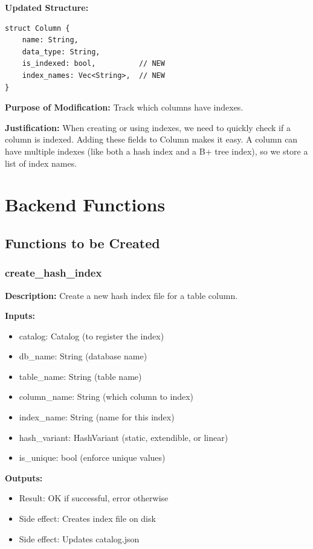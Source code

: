 \documentclass[11pt,a4paper]{article}
\begin{document}
\textbf{Updated Structure:}
\begin{lstlisting}
struct Column {
    name: String,
    data_type: String,
    is_indexed: bool,          // NEW
    index_names: Vec<String>,  // NEW
}
\end{lstlisting}

\textbf{Purpose of Modification:} Track which columns have indexes.

\textbf{Justification:} When creating or using indexes, we need to quickly check if a column is indexed. Adding these fields to Column makes it easy. A column can have multiple indexes (like both a hash index and a B+ tree index), so we store a list of index names.

\section{Backend Functions}

\subsection{Functions to be Created}

\subsubsection{create\_hash\_index}

\textbf{Description:} Create a new hash index file for a table column.

\textbf{Inputs:}
\begin{itemize}
\item catalog: Catalog (to register the index)
\item db\_name: String (database name)
\item table\_name: String (table name)
\item column\_name: String (which column to index)
\item index\_name: String (name for this index)
\item hash\_variant: HashVariant (static, extendible, or linear)
\item is\_unique: bool (enforce unique values)
\end{itemize}

\textbf{Outputs:}
\begin{itemize}
\item Result: OK if successful, error otherwise
\item Side effect: Creates index file on disk
\item Side effect: Updates catalog.json
\end{itemize}
\end{document}
